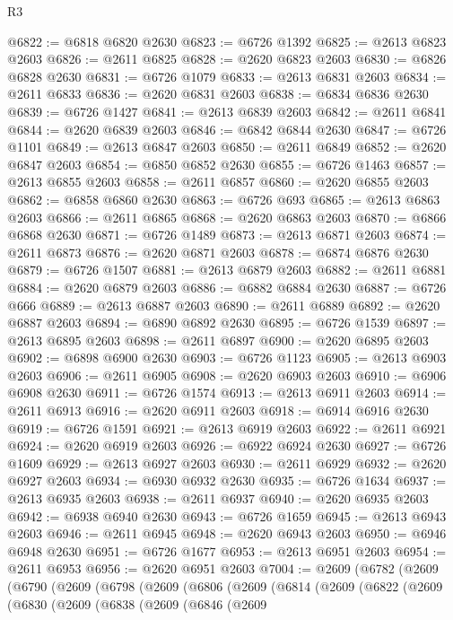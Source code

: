 \begin{lexlean}{R3}
\begin{coremodule}
@6822 := @6818 @6820 @2630
@6823 := @6726 @1392
@6825 := @2613 @6823 @2603
@6826 := @2611 @6825
@6828 := @2620 @6823 @2603
@6830 := @6826 @6828 @2630
@6831 := @6726 @1079
@6833 := @2613 @6831 @2603
@6834 := @2611 @6833
@6836 := @2620 @6831 @2603
@6838 := @6834 @6836 @2630
@6839 := @6726 @1427
@6841 := @2613 @6839 @2603
@6842 := @2611 @6841
@6844 := @2620 @6839 @2603
@6846 := @6842 @6844 @2630
@6847 := @6726 @1101
@6849 := @2613 @6847 @2603
@6850 := @2611 @6849
@6852 := @2620 @6847 @2603
@6854 := @6850 @6852 @2630
@6855 := @6726 @1463
@6857 := @2613 @6855 @2603
@6858 := @2611 @6857
@6860 := @2620 @6855 @2603
@6862 := @6858 @6860 @2630
@6863 := @6726 @693
@6865 := @2613 @6863 @2603
@6866 := @2611 @6865
@6868 := @2620 @6863 @2603
@6870 := @6866 @6868 @2630
@6871 := @6726 @1489
@6873 := @2613 @6871 @2603
@6874 := @2611 @6873
@6876 := @2620 @6871 @2603
@6878 := @6874 @6876 @2630
@6879 := @6726 @1507
@6881 := @2613 @6879 @2603
@6882 := @2611 @6881
@6884 := @2620 @6879 @2603
@6886 := @6882 @6884 @2630
@6887 := @6726 @666
@6889 := @2613 @6887 @2603
@6890 := @2611 @6889
@6892 := @2620 @6887 @2603
@6894 := @6890 @6892 @2630
@6895 := @6726 @1539
@6897 := @2613 @6895 @2603
@6898 := @2611 @6897
@6900 := @2620 @6895 @2603
@6902 := @6898 @6900 @2630
@6903 := @6726 @1123
@6905 := @2613 @6903 @2603
@6906 := @2611 @6905
@6908 := @2620 @6903 @2603
@6910 := @6906 @6908 @2630
@6911 := @6726 @1574
@6913 := @2613 @6911 @2603
@6914 := @2611 @6913
@6916 := @2620 @6911 @2603
@6918 := @6914 @6916 @2630
@6919 := @6726 @1591
@6921 := @2613 @6919 @2603
@6922 := @2611 @6921
@6924 := @2620 @6919 @2603
@6926 := @6922 @6924 @2630
@6927 := @6726 @1609
@6929 := @2613 @6927 @2603
@6930 := @2611 @6929
@6932 := @2620 @6927 @2603
@6934 := @6930 @6932 @2630
@6935 := @6726 @1634
@6937 := @2613 @6935 @2603
@6938 := @2611 @6937
@6940 := @2620 @6935 @2603
@6942 := @6938 @6940 @2630
@6943 := @6726 @1659
@6945 := @2613 @6943 @2603
@6946 := @2611 @6945
@6948 := @2620 @6943 @2603
@6950 := @6946 @6948 @2630
@6951 := @6726 @1677
@6953 := @2613 @6951 @2603
@6954 := @2611 @6953
@6956 := @2620 @6951 @2603
@7004 := @2609
    (@6782
      (@2609
        (@6790
          (@2609
            (@6798
              (@2609
                (@6806
                  (@2609
                    (@6814
                      (@2609
                        (@6822
                          (@2609
                            (@6830
                              (@2609
                                (@6838
                                  (@2609
                                    (@6846
                                      (@2609

\end{coremodule}
\end{lexlean}
